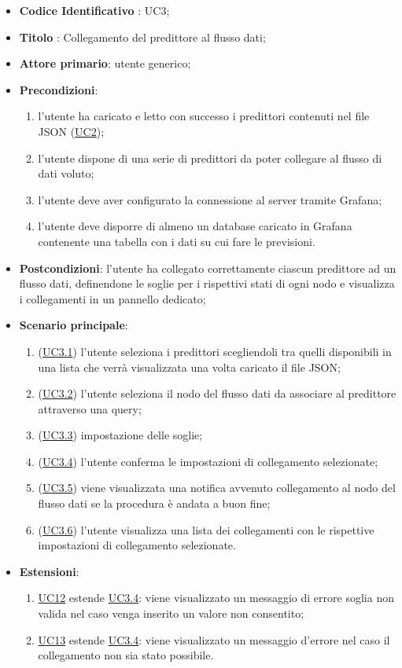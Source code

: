 		\begin{itemize}
			\item\textbf{Codice Identificativo} : UC3;
			\item\textbf{Titolo} : Collegamento del predittore al flusso dati;
			\item\textbf{Attore primario}: utente generico;
			\item\textbf{Precondizioni}:
				\begin{enumerate}
					\item l'utente ha caricato e letto con successo i predittori contenuti nel file JSON (\hyperref[par:UC2]{UC2});
					\item l'utente dispone di una serie di predittori da poter collegare al flusso di dati voluto;
					\item l’utente deve aver configurato la connessione al server tramite Grafana;
					\item l’utente deve disporre di almeno un database caricato in Grafana contenente una tabella con i dati su cui fare le previsioni.

					
				\end{enumerate}
			\item\textbf{Postcondizioni}: l'utente ha collegato correttamente ciascun predittore ad un flusso dati, definendone le soglie per i rispettivi stati di ogni nodo e visualizza i collegamenti in un pannello dedicato;
			\item\textbf{Scenario principale}:
				\begin{enumerate}
					\item (\hyperref[par:UC3.1]{UC3.1}) l'utente seleziona i predittori scegliendoli tra quelli disponibili in una lista che verrà visualizzata una volta caricato il file JSON;
					\item (\hyperref[par:UC3.2]{UC3.2}) l'utente seleziona il nodo del flusso dati da associare al predittore attraverso una query\glo;
					\item (\hyperref[par:UC3.3]{UC3.3}) impostazione delle soglie;
					\item (\hyperref[par:UC3.4]{UC3.4}) l'utente conferma le impostazioni di collegamento selezionate;	
					\item (\hyperref[par:UC3.5]{UC3.5}) viene visualizzata una notifica avvenuto collegamento al nodo del flusso dati se la procedura è andata a buon fine;
					\item (\hyperref[par:UC3.6]{UC3.6}) l'utente visualizza una lista dei collegamenti con le rispettive impostazioni di collegamento selezionate.
				\end{enumerate}
			\item\textbf{Estensioni}:
				\begin{enumerate}
					\item\hyperref[par:UC12]{UC12} estende \hyperref[par:UC3.4]{UC3.4}: viene visualizzato un messaggio di errore soglia non valida nel caso venga inserito un valore non consentito;
					\item\hyperref[par:UC13]{UC13} estende \hyperref[par:UC3.4]{UC3.4}: viene visualizzato un messaggio d'errore nel caso il collegamento non sia stato possibile.
						

\end{enumerate}
\end{itemize}
